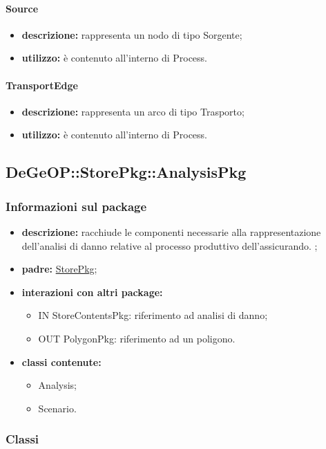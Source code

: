 \paragraph{Source}
\begin{itemize}
	\item \textbf{descrizione:} rappresenta un nodo di tipo Sorgente;
	\item \textbf{utilizzo:} è contenuto all'interno di Process.
\end{itemize}
\paragraph{TransportEdge}
\begin{itemize}
	\item \textbf{descrizione:} rappresenta un arco di tipo Trasporto;
	\item \textbf{utilizzo:} è contenuto all'interno di Process.
\end{itemize}
\newpage
\subsection{DeGeOP::StorePkg::AnalysisPkg}
\label{pkg::AnalysisPkg}
\subsubsection{Informazioni sul package}
\begin{itemize}
	\item \textbf{descrizione:} racchiude le componenti necessarie alla rappresentazione dell'analisi di danno relative al processo produttivo dell'assicurando. ;
	\item \textbf{padre:} \hyperref[pkg::StorePkg]{StorePkg};
	\item \textbf{interazioni con altri package:} 
	\begin{itemize}
		\item IN StoreContentsPkg: riferimento ad analisi di danno;
		\item OUT PolygonPkg: riferimento ad un poligono.
	\end{itemize}
	\item \textbf{classi contenute:}
	\begin{itemize}
		\item Analysis;
		\item Scenario.
	\end{itemize}
\end{itemize}
\subsubsection{Classi}
